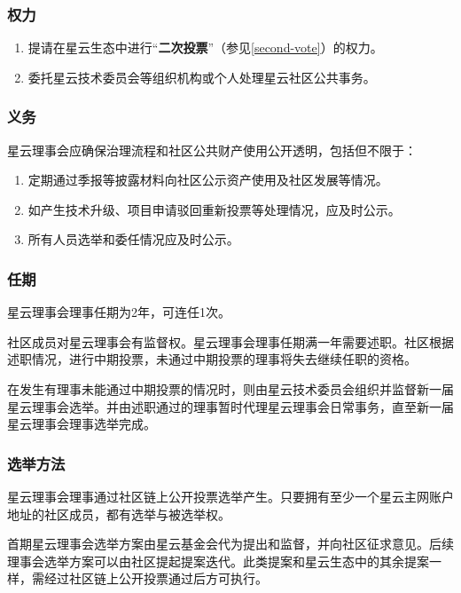 \subsubsection{权力}

\begin{enumerate}
	\item 提请在星云生态中进行“\textbf{二次投票}”（参见\ref{second-vote}）的权力。
	\item 委托星云技术委员会等组织机构或个人处理星云社区公共事务。
\end{enumerate}

\subsubsection{义务}

星云理事会应确保治理流程和社区公共财产使用公开透明，包括但不限于：

\begin{enumerate}
	\item 定期通过季报等披露材料向社区公示资产使用及社区发展等情况。
	\item 如产生技术升级、项目申请驳回重新投票等处理情况，应及时公示。
	\item 所有人员选举和委任情况应及时公示。
\end{enumerate}

\subsubsection{任期}

星云理事会理事任期为2年，可连任1次。

\vspace{2em}

社区成员对星云理事会有监督权。星云理事会理事任期满一年需要述职。社区根据述职情况，进行中期投票，未通过中期投票的理事将失去继续任职的资格。

在发生有理事未能通过中期投票的情况时，则由星云技术委员会组织并监督新一届星云理事会选举。并由述职通过的理事暂时代理星云理事会日常事务，直至新一届星云理事会理事选举完成。

\subsubsection{选举方法}

星云理事会理事通过社区链上公开投票选举产生。只要拥有至少一个星云主网账户地址的社区成员，都有选举与被选举权。

首期星云理事会选举方案由星云基金会代为提出和监督，并向社区征求意见。后续理事会选举方案可以由社区提起提案迭代。此类提案和星云生态中的其余提案一样，需经过社区链上公开投票通过后方可执行。


